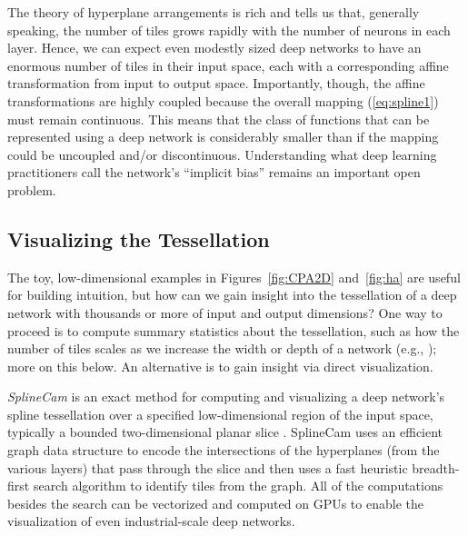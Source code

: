 \documentclass{notices}
\begin{document}
The theory of hyperplane arrangements is rich and tells us that, generally speaking, the number of tiles grows %
rapidly with the number of neurons in each layer.
Hence, we can expect even modestly sized deep networks to have an enormous number of tiles in their input space, each with a corresponding affine transformation from input to output space.
Importantly, though, the affine transformations are highly coupled because the overall mapping (\ref{eq:spline1}) must remain continuous.
This means that the class of functions that can be represented using a deep network is considerably smaller than if the mapping could be uncoupled and/or discontinuous.
Understanding what deep learning practitioners call the network's ``implicit bias'' remains an important open problem.


\subsection*{Visualizing the Tessellation}

The toy, low-dimensional examples in Figures~\ref{fig:CPA2D} and~\ref{fig:ha} are useful for building intuition, but how can we gain insight into the tessellation of a deep network with thousands or more of input and output dimensions? 
One way to proceed is to compute summary statistics about the tessellation, such as how the number of tiles scales as we increase the width or depth of a network (e.g., \cite{montufar2014number}); more on this below.
An alternative is to gain insight via direct visualization.


{\em SplineCam} is an exact method for computing and visualizing a deep network's spline tessellation over a specified low-dimensional region of the input space, typically a bounded two-dimensional planar slice \cite{splinecam}.
SplineCam uses an efficient graph data structure to encode the intersections of the hyperplanes (from the various layers) that pass through the slice and then uses a fast heuristic breadth-first search algorithm to identify tiles from the graph. 
All of the computations besides the search can be vectorized and computed on GPUs to enable the visualization of even industrial-scale deep networks. 
\end{document}
